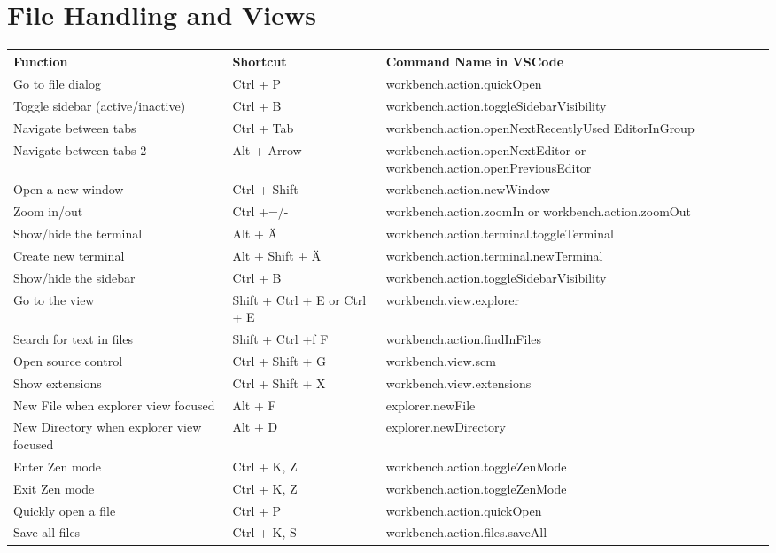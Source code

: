 \documentclass{article}
\begin{document}
\section*{File Handling and Views}
\begin{longtable}{|p{6cm}|p{3cm}|p{7cm}|}
\hline
\rowcolor{white}
\textbf{Function} & \textbf{Shortcut} & \textbf{Command Name in VSCode} \\
\hline
Go to file dialog & Ctrl + P & workbench.action.quickOpen \\
Toggle sidebar (active/inactive) & Ctrl + B & workbench.action.toggleSidebarVisibility \\
Navigate between tabs & Ctrl + Tab & workbench.action.openNextRecentlyUsed EditorInGroup \\
Navigate between tabs 2 & Alt + Arrow & workbench.action.openNextEditor or workbench.action.openPreviousEditor \\
Open a new window & Ctrl + Shift & workbench.action.newWindow \\
Zoom in/out & Ctrl +=/- & workbench.action.zoomIn or workbench.action.zoomOut \\
Show/hide the terminal & Alt + Ä & workbench.action.terminal.toggleTerminal \\
Create new terminal & Alt + Shift + Ä & workbench.action.terminal.newTerminal \\
Show/hide the sidebar & Ctrl + B & workbench.action.toggleSidebarVisibility \\
Go to the view & Shift + Ctrl + E or Ctrl + E & workbench.view.explorer \\
Search for text in files & Shift + Ctrl +f F & workbench.action.findInFiles \\
Open source control & Ctrl + Shift + G & workbench.view.scm \\
Show extensions & Ctrl + Shift + X & workbench.view.extensions \\
New File when explorer view focused & Alt + F & explorer.newFile \\
New Directory when explorer view focused & Alt + D & explorer.newDirectory \\
Enter Zen mode & Ctrl + K, Z & workbench.action.toggleZenMode \\
Exit Zen mode & Ctrl + K, Z & workbench.action.toggleZenMode \\
Quickly open a file & Ctrl + P & workbench.action.quickOpen \\
Save all files & Ctrl + K, S & workbench.action.files.saveAll \\

\end{longtable}
\end{document}
